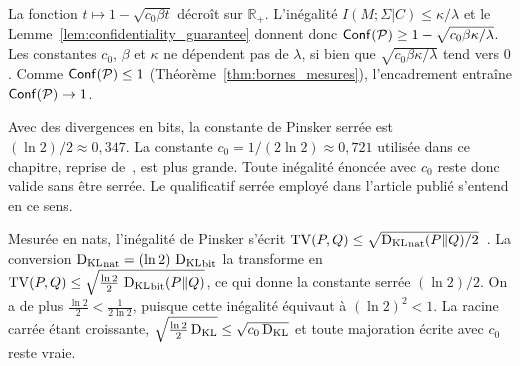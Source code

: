 \begin{sloppypar}
\begin{Preuve}
La fonction $t \mapsto 1 - \sqrt{c_0 \beta t}$ d\'ecro\^it sur $\mathbb{R}_+$.
L'in\'egalit\'e $I(M;\Sigma|C) \leq \kappa/\lambda$ et le
Lemme~\ref{lem:confidentiality_guarantee} donnent donc
$\mathsf{Conf}(\mathcal{P}) \geq 1 - \sqrt{c_0 \beta \kappa/\lambda}$. Les constantes
$c_0$, $\beta$ et $\kappa$ ne d\'ependent pas de $\lambda$, si bien que
$\sqrt{c_0 \beta \kappa/\lambda}$ tend vers $0$. Comme
$\mathsf{Conf}(\mathcal{P}) \leq 1$ (Th\'eor\`eme~\ref{thm:bornes_mesures}), l'encadrement
entra\^ine $\mathsf{Conf}(\mathcal{P}) \to 1$.
\end{Preuve}

\begin{remark}[Constante $c_0$]
\label{rem:constante_c0}
Avec des divergences en bits, la constante de Pinsker serr\'ee est
$(\ln 2)/2 \approx 0{,}347$. La constante $c_0 = 1/(2\ln 2) \approx
0{,}721$ utilis\'ee dans ce chapitre, reprise de~\cite{MINKA2026CRO}, est plus
grande. Toute in\'egalit\'e \'enonc\'ee avec $c_0$ reste donc valide sans \^etre
serr\'ee. Le qualificatif \og serr\'ee\fg{} employ\'e dans l'article publi\'e
s'entend en ce sens.
\end{remark}

\begin{Preuve}
Mesur\'ee en nats, l'in\'egalit\'e de Pinsker s'\'ecrit
$\operatorname{TV}(P,Q) \leq \sqrt{\operatorname{D_{\text{KL}}}_{\mathrm{nat}}(P\|Q)/2}$~\cite{CoverThomas06}. La
conversion $\operatorname{D_{\text{KL}}}_{\mathrm{nat}} = (\ln 2)\,\operatorname{D_{\text{KL}}}_{\mathrm{bit}}$ la transforme en
$\operatorname{TV}(P,Q) \leq \sqrt{\tfrac{\ln 2}{2}\,\operatorname{D_{\text{KL}}}_{\mathrm{bit}}(P\|Q)}$, ce qui donne
la constante serr\'ee $(\ln 2)/2$. On a de plus
$\frac{\ln 2}{2} < \frac{1}{2\ln 2}$, puisque cette in\'egalit\'e \'equivaut \`a
$(\ln 2)^2 < 1$. La racine carr\'ee \'etant croissante,
$\sqrt{\tfrac{\ln 2}{2}\operatorname{D_{\text{KL}}}} \leq \sqrt{c_0 \operatorname{D_{\text{KL}}}}$ et toute majoration \'ecrite
avec $c_0$ reste vraie.
\end{Preuve}


\end{sloppypar}
